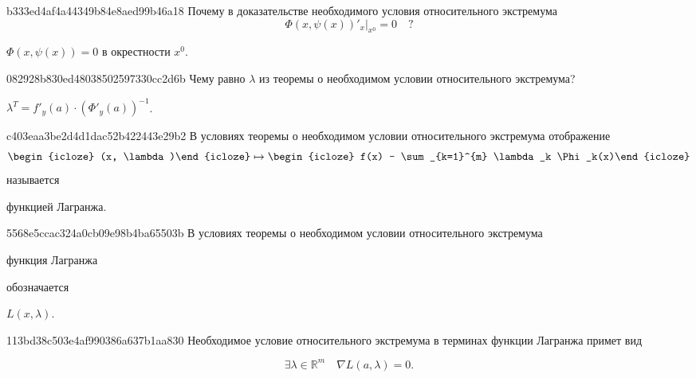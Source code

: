 \begin{note}{b333ed4af4a44349b84e8aed99b46a18}
    Почему в доказательстве необходимого условия относительного экстремума
    \[
        \Phi(x, \psi(x))'_{x} \Big|_{x^{0}} = 0 \quad \text{?}
    \]

    \begin{cloze}{1}
        \({ \Phi(x, \psi(x)) = 0 }\) в окрестности \({ x^{0} }\).
    \end{cloze}
\end{note}

\begin{note}{082928b830ed48038502597330cc2d6b}
    Чему равно \({ \lambda }\) из теоремы о необходимом условии относительного экстремума?

    \begin{cloze}{1}
        \({ \lambda^{T} = f'_{y}(a) \cdot \left( \Phi'_{y}(a) \right)^{-1} }\).
    \end{cloze}
\end{note}

\begin{note}{c403eaa3be2d4d1dac52b422443e29b2}
    В условиях теоремы о необходимом условии относительного экстремума отображение
    \[
        \begin{icloze}{3}(x, \lambda)\end{icloze} \mapsto \begin{icloze}{2}f(x) - \sum_{k=1}^{m} \lambda_k \Phi_k(x)\end{icloze}
    \]
    называется \begin{icloze}{1}функцией Лагранжа.\end{icloze}
\end{note}

\begin{note}{5568e5ccac324a0cb09e98b4ba65503b}
    В условиях теоремы о необходимом условии относительного экстремума \begin{icloze}{2}функция Лагранжа\end{icloze} обозначается \begin{icloze}{1}\({ L(x, \lambda) }\).\end{icloze}
\end{note}

\begin{note}{113bd38c503e4af990386a637b1aa830}
    Необходимое условие относительного экстремума в терминах функции Лагранжа примет вид
    \begin{icloze}{1}
        \[
            \exists \lambda \in \mathbb R^{m} \quad \nabla L(a, \lambda) = 0.
        \]
    \end{icloze}
\end{note}

